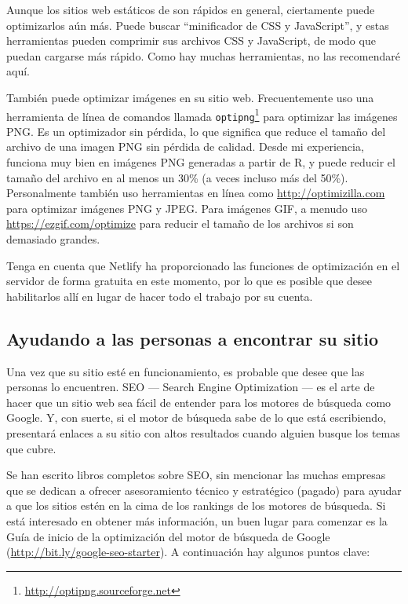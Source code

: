 \documentclass[12pt,]{krantz}
\renewcommand{\href}[2]{#2\footnote{\url{#1}}}
\theoremstyle{definition}
\theoremstyle{definition}
\theoremstyle{definition}
\theoremstyle{remark}
\begin{document}
Aunque los sitios web estáticos de  son rápidos en
general, ciertamente puede optimizarlos aún más. Puede buscar
``minificador de CSS y JavaScript'', y estas herramientas pueden
comprimir sus archivos CSS y JavaScript, de modo que puedan cargarse más
rápido. Como hay muchas herramientas, no las recomendaré aquí.

También puede optimizar imágenes en su sitio web. Frecuentemente uso una
herramienta de línea de comandos llamada
\href{http://optipng.sourceforge.net}{\texttt{optipng}} para optimizar
las imágenes PNG. Es un optimizador sin pérdida, lo que significa que
reduce el tamaño del archivo de una imagen PNG sin pérdida de calidad.
Desde mi experiencia, funciona muy bien en imágenes PNG generadas a
partir de R, y puede reducir el tamaño del archivo en al menos un 30\%
(a veces incluso más del 50\%). Personalmente también uso herramientas
en línea como \url{http://optimizilla.com} para optimizar imágenes PNG y
JPEG. Para imágenes GIF, a menudo uso \url{https://ezgif.com/optimize}
para reducir el tamaño de los archivos si son demasiado grandes.

Tenga en cuenta que Netlify ha proporcionado las funciones de
optimización en el servidor de forma gratuita en este momento, por lo
que es posible que desee habilitarlos allí en lugar de hacer todo el
trabajo por su cuenta.

\hypertarget{ayudando-a-las-personas-a-encontrar-su-sitio}{%
\subsection{Ayudando a las personas a encontrar su
sitio}\label{ayudando-a-las-personas-a-encontrar-su-sitio}}

Una vez que su sitio esté en funcionamiento, es probable que desee que
las personas lo encuentren. SEO --- Search Engine Optimization --- es el
arte de hacer que un sitio web sea fácil de entender para los motores de
búsqueda como Google. Y, con suerte, si el motor de búsqueda sabe de lo
que está escribiendo, presentará enlaces a su sitio con altos resultados
cuando alguien busque los temas que cubre.

Se han escrito libros completos sobre SEO, sin mencionar las muchas
empresas que se dedican a ofrecer asesoramiento técnico y estratégico
(pagado) para ayudar a que los sitios estén en la cima de los rankings
de los motores de búsqueda. Si está interesado en obtener más
información, un buen lugar para comenzar es la Guía de inicio de la
optimización del motor de búsqueda de Google
(\url{http://bit.ly/google-seo-starter}). A continuación hay algunos
puntos clave:
\end{document}
